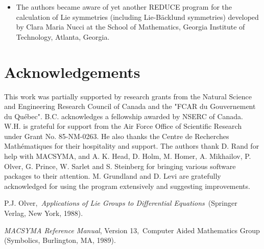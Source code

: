 {\begin{itemize}
In some cases it is not possible to select the $v^i$ in such a way that
the differential consequences would not reintroduce lower order derivatives 
of the $v^i$, hence causing a loop!  Therefore, we have make the substitution 
of the partial derivatives of the $v^i$ optional. If only the $v^i$ should be 
replaced and not their derivatives, one puts 
{\em subst\_deriv\_of\_vi} : false.

The resulting system of determining equations is `equivalent' with the one
obtained using the substitution of all the partial derivatives of the $v^i$.
In the later case the system of determining equations may be somewhat simpler,
but the extra substitutions consume time.

\item The authors became aware of yet another REDUCE program for the 
calculation of Lie symmetries (including Lie-B\"{a}cklund symmetries) 
developed by Clara Maria Nucci at the School of Mathematics, Georgia Institute 
of Technology, Atlanta, Georgia. 
\end{itemize}

\vfill
\newpage
\section*{Acknowledgements}

This work was partially supported by research grants from the Natural
Science and Engineering Research Council of Canada and the "FCAR du
Gouvernement du Qu\'{e}bec". B.C. acknowledges a fellowship
awarded by NSERC of Canada. W.H. is grateful for support from
the Air Force Office of Scientific Research under Grant No. 85-NM-0263.
He also thanks the Centre de Recherches Math\'{e}matiques for their hospitality
and support.
The authors thank D. Rand for help with MACSYMA, and 
A. K. Head, D. Holm, M. Homer, A. Mikhailov, P. Olver, G. Prince, W. Sarlet and
S. Steinberg for bringing various software packages to their attention.
M. Grundland and D. Levi are gratefully acknowledged for using the
program extensively and suggesting improvements.

\vfill
\newpage

\begin{thebibliography}{99}

 {\sc P.J. Olver},\, 
{\em Applications of Lie Groups to Differential Equations}\, 
(Springer Verlag, New York, 1988).

 {\em MACSYMA Reference Manual}, Version 13,\,
Computer Aided Mathematics Group\, (Symbolics, Burlington, MA, 1989).


\end{thebibliography}}
